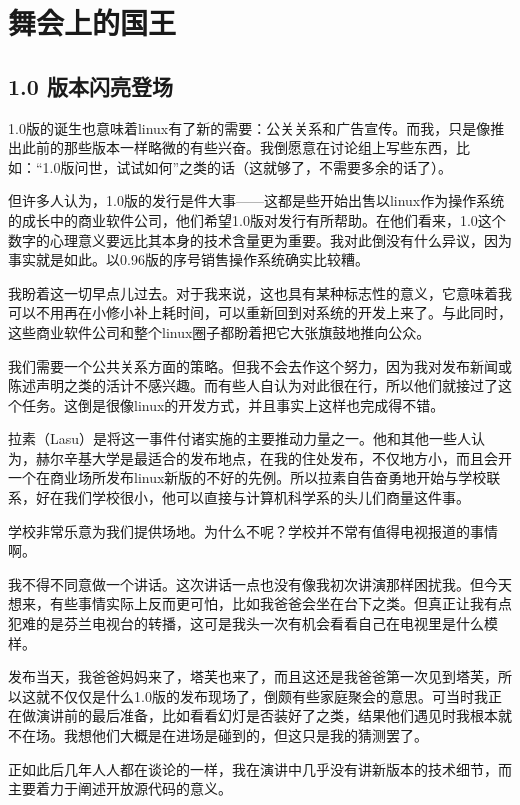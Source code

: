 \chapter{舞会上的国王}

 
\section{1.0 版本闪亮登场}

1.0版的诞生也意味着linux有了新的需要：公关关系和广告宣传。而我，只是像推出此前的那些版本一样略微的有些兴奋。我倒愿意在讨论组上写些东西，比如：“1.0版问世，试试如何”之类的话（这就够了，不需要多余的话了）。

但许多人认为，1.0版的发行是件大事——这都是些开始出售以linux作为操作系统的成长中的商业软件公司，他们希望1.0版对发行有所帮助。在他们看来，1.0这个数字的心理意义要远比其本身的技术含量更为重要。我对此倒没有什么异议，因为事实就是如此。以0.96版的序号销售操作系统确实比较糟。

我盼着这一切早点儿过去。对于我来说，这也具有某种标志性的意义，它意味着我可以不用再在小修小补上耗时间，可以重新回到对系统的开发上来了。与此同时，这些商业软件公司和整个linux圈子都盼着把它大张旗鼓地推向公众。

我们需要一个公共关系方面的策略。但我不会去作这个努力，因为我对发布新闻或陈述声明之类的活计不感兴趣。而有些人自认为对此很在行，所以他们就接过了这个任务。这倒是很像linux的开发方式，并且事实上这样也完成得不错。

拉素（Lasu）是将这一事件付诸实施的主要推动力量之一。他和其他一些人认为，赫尔辛基大学是最适合的发布地点，在我的住处发布，不仅地方小，而且会开一个在商业场所发布linux新版的不好的先例。所以拉素自告奋勇地开始与学校联系，好在我们学校很小，他可以直接与计算机科学系的头儿们商量这件事。

学校非常乐意为我们提供场地。为什么不呢？学校并不常有值得电视报道的事情啊。

我不得不同意做一个讲话。这次讲话一点也没有像我初次讲演那样困扰我。但今天想来，有些事情实际上反而更可怕，比如我爸爸会坐在台下之类。但真正让我有点犯难的是芬兰电视台的转播，这可是我头一次有机会看看自己在电视里是什么模样。

发布当天，我爸爸妈妈来了，塔芙也来了，而且这还是我爸爸第一次见到塔芙，所以这就不仅仅是什么1.0版的发布现场了，倒颇有些家庭聚会的意思。可当时我正在做演讲前的最后准备，比如看看幻灯是否装好了之类，结果他们遇见时我根本就不在场。我想他们大概是在进场是碰到的，但这只是我的猜测罢了。

正如此后几年人人都在谈论的一样，我在演讲中几乎没有讲新版本的技术细节，而主要着力于阐述开放源代码的意义。

